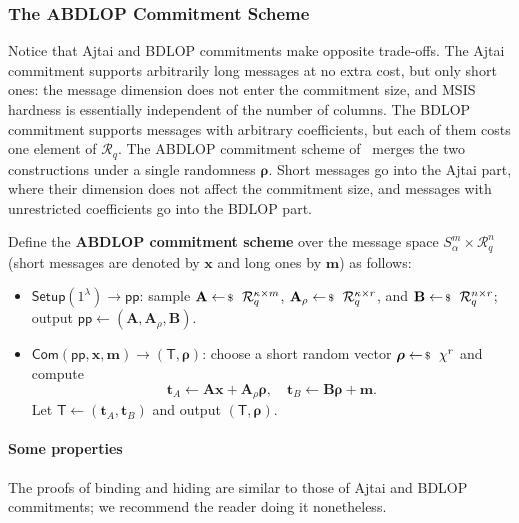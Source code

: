 \documentclass[../../book.tex]{subfiles}
\begin{document}
\subsubsection{The ABDLOP Commitment Scheme}

Notice that Ajtai and BDLOP commitments make opposite trade-offs.
The Ajtai commitment supports arbitrarily long messages at no extra cost, but only short ones: the message dimension does not enter the commitment size, and MSIS hardness is essentially independent of the number of columns.
The BDLOP commitment supports messages with arbitrary coefficients, but each of them costs one element of $\mathcal{R}_q$.
The ABDLOP commitment scheme of~\cite{C:LyuNguPla22} merges the two constructions under a single randomness $\boldsymbol{\rho}$.
Short messages go into the Ajtai part, where their dimension does not affect the commitment size, and messages with unrestricted coefficients go into the BDLOP part.

\begin{definition}\label{def:abdlop}
    Define the \textbf{ABDLOP commitment scheme} over the message space $S_{\alpha}^m \times \mathcal{R}_q^n$ (short messages are denoted by $\mathbf{x}$ and long ones by $\mathbf{m}$) as follows:
    \begin{itemize}
        \item $\mathsf{Setup}(1^{\lambda}) \to \mathsf{pp}$: sample $\mathbf{A} \leftarrowS \mathcal{R}_q^{\kappa \times m}$, $\mathbf{A}_{\rho} \leftarrowS \mathcal{R}_q^{\kappa \times r}$, and $\mathbf{B} \leftarrowS \mathcal{R}_q^{n \times r}$; output $\mathsf{pp} \gets (\mathbf{A}, \mathbf{A}_{\rho}, \mathbf{B})$.
        \item $\mathsf{Com}(\mathsf{pp}, \mathbf{x}, \mathbf{m}) \to (\mathsf{T}, \boldsymbol{\rho})$: choose a short random vector $\boldsymbol{\rho} \leftarrowS \chi^r$ and compute
        \begin{equation*}
            \mathbf{t}_A \gets \mathbf{A}\mathbf{x} + \mathbf{A}_{\rho}\boldsymbol{\rho}, \quad \mathbf{t}_B \gets \mathbf{B}\boldsymbol{\rho} + \mathbf{m}.
        \end{equation*}
        Let $\mathsf{T} \gets (\mathbf{t}_A, \mathbf{t}_B)$ and output $(\mathsf{T}, \boldsymbol{\rho})$.
    \end{itemize}
\end{definition}

\paragraph{Some properties} The proofs of binding and hiding are similar to those of Ajtai and BDLOP commitments; we recommend the reader doing it nonetheless.
\end{document}
